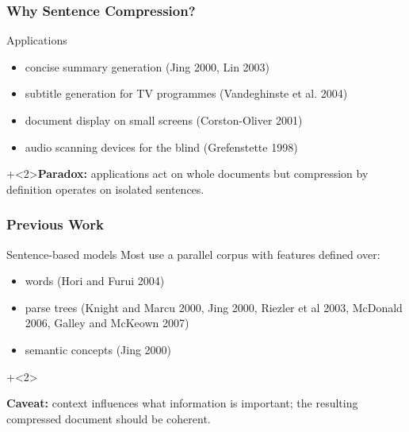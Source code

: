\documentclass{beamer}
\begin{document}
\begin{frame}
  \frametitle{Why Sentence Compression?}

\begin{block}{Applications}
\begin{itemize}
\item concise summary generation  (Jing 2000, Lin 2003)
\item subtitle generation for TV programmes (Vandeghinste et
  al. 2004)
\item document display on small screens (Corston-Oliver 2001)
\item audio scanning devices for the blind (Grefenstette 1998)
\end{itemize}
\end{block}
  \vspace{2ex}
\onslide+<2>{\textbf{Paradox:} applications act on \alert{whole
    documents} but compression by definition operates on  isolated sentences.}
\end{frame}



\begin{frame}
  \frametitle{Previous Work}
  

  \begin{block}{Sentence-based models}
  Most use a parallel corpus with features defined over:

  \begin{itemize}
  \item words (Hori and Furui 2004)
  \item parse trees (Knight and Marcu 2000, Jing 2000, Riezler et al 2003,
    McDonald 2006, Galley and McKeown 2007)
  \item semantic concepts (Jing 2000)
  \end{itemize}
\end{block}

 \vspace{2ex}
\onslide+<2>{\textbf{Caveat:} \alert{context} influences what
  information is important; the resulting compressed document should
  be \alert{coherent}. 

}
\end{frame}
\end{document}
